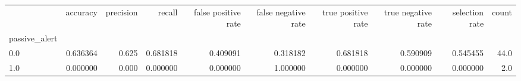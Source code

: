\begin{tabular}{lrrrrrrrrr}
\toprule
{} &  accuracy &  precision &    recall &  false positive rate &  false negative rate &  true positive rate &  true negative rate &  selection rate &  count \\
passive\_alert &           &            &           &                      &                      &                     &                     &                 &        \\
\midrule
0.0           &  0.636364 &      0.625 &  0.681818 &             0.409091 &             0.318182 &            0.681818 &            0.590909 &        0.545455 &   44.0 \\
1.0           &  0.000000 &      0.000 &  0.000000 &             0.000000 &             1.000000 &            0.000000 &            0.000000 &        0.000000 &    2.0 \\
\bottomrule
\end{tabular}
